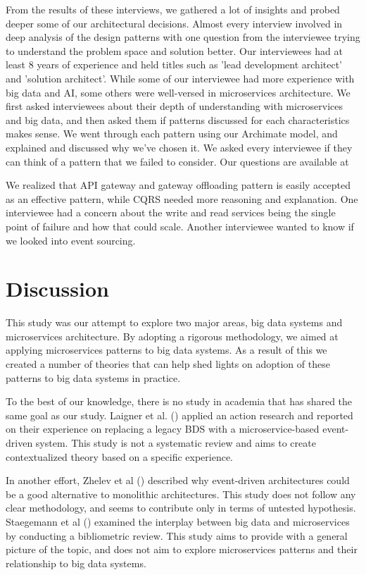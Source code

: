 \documentclass[conference]{IEEEtran}
\begin{document}
From the results of these interviews, we gathered a lot of insights and probed deeper some of our architectural decisions. Almost every interview involved in deep analysis of the design patterns with one question from the interviewee trying to understand the problem space and solution better. Our interviewees had at least 8 years of experience and held titles such as 'lead development architect' and 'solution architect'. While some of our interviewee had more experience with big data and AI, some others were well-versed in microservices architecture. We first asked interviewees about their depth of understanding with microservices and big data, and then asked them if patterns discussed for each characteristics makes sense. We went through each pattern using our Archimate model, and explained and discussed why we've chosen it. We asked every interviewee if they can think of a pattern that we failed to consider. Our questions are available at 

We realized that API gateway and gateway offloading pattern is easily accepted as an effective pattern, while CQRS needed more reasoning and explanation. One interviewee had a concern about the write and read services being the single point of failure and how that could scale. Another interviewee wanted to know if we looked into event sourcing. 

\section{Discussion}
This study was our attempt to explore two major areas, big data systems and microservices architecture. By adopting a rigorous methodology, we aimed at applying microservices patterns to big data systems. As a result of this we created a number of theories that can help shed lights on adoption of these patterns to big data systems in practice. 

To the best of our knowledge, there is no study in academia that has shared the same goal as our study. Laigner et al. (\cite{laigner2020monolithic}) applied an action research and reported on their experience on replacing a legacy BDS with a microservice-based event-driven system. This study is not a systematic review and aims to create contextualized theory based on a specific experience. 

In another effort,  Zhelev et al (\cite{zhelev2019using}) described why event-driven architectures could be a good alternative to monolithic architectures. This study does not follow any clear methodology, and seems to contribute only in terms of untested hypothesis. Staegemann et al (\cite{staegemann2021examining}) examined the interplay between big data and microservices by conducting a bibliometric review. This study aims to provide with a general picture of the topic, and does not aim to explore microservices patterns and their relationship to big data systems.  
\end{document}
